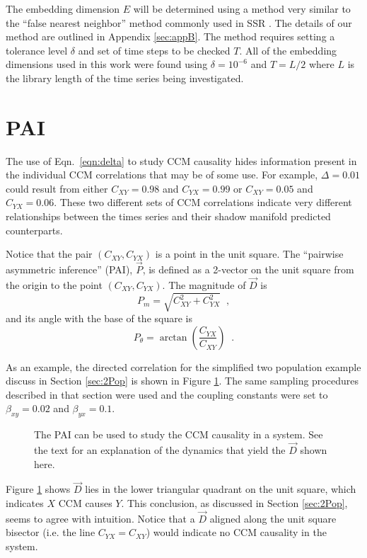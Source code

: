 \documentclass[a4paper,11pt]{article}
\begin{document}
The embedding dimension $E$ will be determined using a method very similar to the ``false nearest neighbor'' method commonly used in SSR \cite{Kennel1992}.  The details of our method are outlined in Appendix \ref{sec:appB}.  The method requires setting a tolerance level $\delta$ and set of time steps to be checked $T$.  All of the embedding dimensions used in this work were found using $\delta=10^{-6}$ and $T=L/2$ where $L$ is the library length of the time series being investigated.

\section{PAI}
The use of Eqn.\ \ref{eqn:delta} to study CCM causality hides information present in the individual CCM correlations that may be of some use.  For example, $\Delta = 0.01$ could result from either $C_{XY} = 0.98$ and $C_{YX} = 0.99$ or $C_{XY} = 0.05$ and $C_{YX} = 0.06$.  These two different sets of CCM correlations indicate very different relationships between the times series and their shadow manifold predicted counterparts.  

Notice that the pair $\left(C_{XY},C_{YX}\right)$ is a point in the unit square.  The ``pairwise asymmetric inference'' (PAI), $\vec{P}$, is defined as a 2-vector on the unit square from the origin to the point $\left(C_{XY},C_{YX}\right)$.  The magnitude of $\vec{D}$ is 
\begin{equation}
P_m = \sqrt{C_{XY}^2+C_{YX}^2}\;\;,
\end{equation}
and its angle with the base of the square is
\begin{equation}
P_\theta = \arctan\left(\frac{C_{YX}}{C_{XY}}\right)\;\;.
\end{equation}

As an example, the directed correlation for the simplified two population example discuss in Section \ref{sec:2Pop} is shown in Figure \ref{fig:}.  The same sampling procedures described in that section were used and the coupling constants were set to $\beta_{xy}=0.02$ and $\beta_{yx}=0.1$.
\begin{figure}[ht]
\label{fig:}
\caption{The PAI can be used to study the CCM causality in a system.  See the text for an explanation of the dynamics that yield the $\vec{D}$ shown here.}
\end{figure}
Figure \ref{fig:} shows $\vec{D}$ lies in the lower triangular quadrant on the unit square, which indicates $X$ CCM causes $Y$.  This conclusion, as discussed in Section \ref{sec:2Pop}, seems to agree with intuition.  Notice that a $\vec{D}$ aligned along the unit square bisector (i.e. the line $C_{YX}=C_{XY}$) would indicate no CCM causality in the system.
\end{document}
